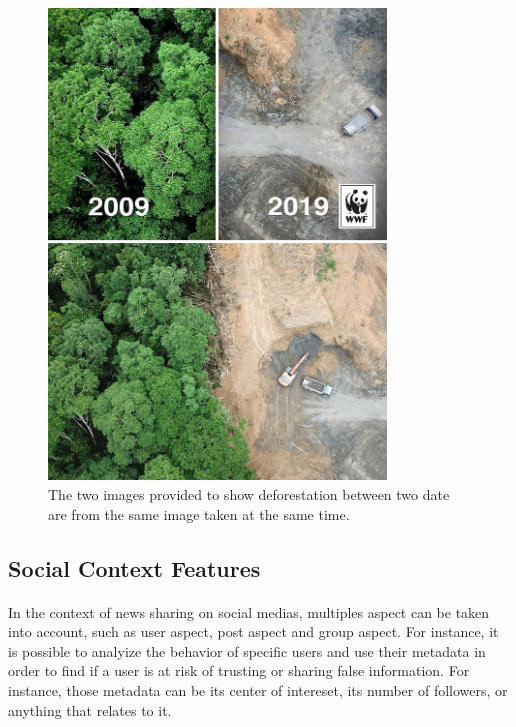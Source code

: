 \begin{figure}
	\centering
	\includegraphics[width=0.8\textwidth]{images/introduction/fake-news-photos-viral-photoshop-8-5c6fe61f88240__700}
	\caption{The two images provided to show deforestation between two date are from the same image taken at the same time.}
	\label{fig:intro:deforestation}
\end{figure}

\subsection{Social Context Features}
\paragraph{} In the context of news sharing on social medias, multiples aspect can be taken into account, such as user aspect, post aspect and group aspect. For instance, it is possible to analyize the behavior of specific users and use their metadata in order to find if a user is at risk of trusting or sharing false information. For instance, those metadata can be its center of intereset, its number of followers, or anything that relates to it. 

